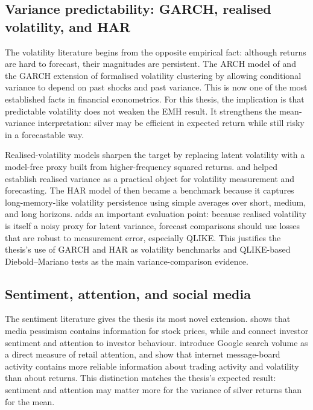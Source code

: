 \documentclass[12pt, a4paper]{article}
\begin{document}
\subsection{Variance predictability: GARCH, realised volatility, and HAR}

The volatility literature begins from the opposite empirical fact: although returns are hard
to forecast, their magnitudes are persistent. The ARCH model of \textcite{engle1982} and the
GARCH extension of \textcite{bollerslev1986} formalised volatility clustering by allowing
conditional variance to depend on past shocks and past variance. This is now one of the most
established facts in financial econometrics. For this thesis, the implication is that
predictable volatility does not weaken the EMH result. It strengthens the mean-variance
interpretation: silver may be efficient in expected return while still risky in a
forecastable way.

Realised-volatility models sharpen the target by replacing latent volatility with a
model-free proxy built from higher-frequency squared returns. \textcite{barndorffnielsen2002}
and \textcite{andersen2003} helped establish realised variance as a practical object for
volatility measurement and forecasting. The HAR model of \textcite{corsi2009} then became a
benchmark because it captures long-memory-like volatility persistence using simple averages
over short, medium, and long horizons. \textcite{patton2011} adds an important evaluation
point: because realised volatility is itself a noisy proxy for latent variance, forecast
comparisons should use losses that are robust to measurement error, especially QLIKE. This
justifies the thesis's use of GARCH and HAR as volatility benchmarks and QLIKE-based
Diebold--Mariano tests as the main variance-comparison evidence.

\subsection{Sentiment, attention, and social media}

The sentiment literature gives the thesis its most novel extension. \textcite{tetlock2007}
shows that media pessimism contains information for stock prices, while \textcite{baker2006}
and \textcite{barber2008} connect investor sentiment and attention to investor behaviour.
\textcite{da2011} introduce Google search volume as a direct measure of retail attention,
and \textcite{antweiler2004} show that internet message-board activity contains more reliable
information about trading activity and volatility than about returns. This distinction
matches the thesis's expected result: sentiment and attention may matter more for the
variance of silver returns than for the mean.
\end{document}
